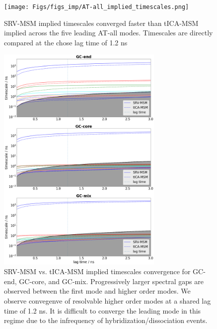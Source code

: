 \documentclass[journal=jpcbfk,manuscript=article]{achemso}
\begin{document}
\begin{figure}[ht!]
	\begin{center}
        \texttt{[image: Figs/figs\_imp/AT-all\_implied\_timescales.png]}
        \caption{SRV-MSM implied timescales converged faster than tICA-MSM implied across the five leading AT-all modes. Timescales are directly compared at the chose lag time of 1.2 ns}
        \label{fig:AT-all_dynamic}
	\end{center}
\end{figure}
\begin{figure}[ht!]
	\begin{center}
        \includegraphics[width=80mm, 
        scale=0.5]{Figs/figs_imp/all_seq_implied_times.png}
        \caption{SRV-MSM vs. tICA-MSM implied timescales convergence for GC-end, GC-core, and GC-mix. Progressively larger spectral gaps are observed between the first mode and higher order modes. We observe convegenve of resolvable higher order modes at a shared lag time of 1.2 ns. It is difficult to converge the leading mode in this regime due to the infrequency of hybridization/dissociation events.}
        \label{fig:all_seq_lags}
	\end{center}
\end{figure}
\end{document}
